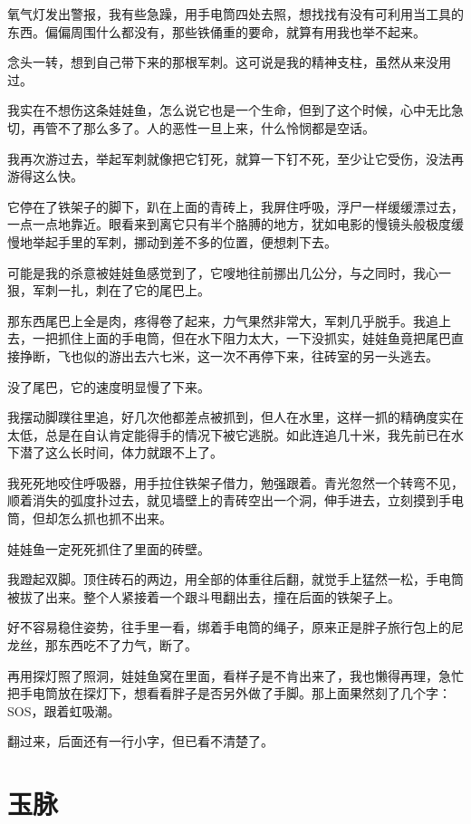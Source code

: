 氧气灯发出警报，我有些急躁，用手电筒四处去照，想找找有没有可利用当工具的东西。偏偏周围什么都没有，那些铁俑重的要命，就算有用我也举不起来。

念头一转，想到自己带下来的那根军刺。这可说是我的精神支柱，虽然从来没用过。

我实在不想伤这条娃娃鱼，怎么说它也是一个生命，但到了这个时候，心中无比急切，再管不了那么多了。人的恶性一旦上来，什么怜悯都是空话。

我再次游过去，举起军刺就像把它钉死，就算一下钉不死，至少让它受伤，没法再游得这么快。

它停在了铁架子的脚下，趴在上面的青砖上，我屏住呼吸，浮尸一样缓缓漂过去，一点一点地靠近。眼看来到离它只有半个胳膊的地方，犹如电影的慢镜头般极度缓慢地举起手里的军刺，挪动到差不多的位置，便想刺下去。

可能是我的杀意被娃娃鱼感觉到了，它嗖地往前挪出几公分，与之同时，我心一狠，军刺一扎，刺在了它的尾巴上。

那东西尾巴上全是肉，疼得卷了起来，力气果然非常大，军刺几乎脱手。我追上去，一把抓住上面的手电筒，但在水下阻力太大，一下没抓实，娃娃鱼竟把尾巴直接挣断，飞也似的游出去六七米，这一次不再停下来，往砖室的另一头逃去。

没了尾巴，它的速度明显慢了下来。

我摆动脚蹼往里追，好几次他都差点被抓到，但人在水里，这样一抓的精确度实在太低，总是在自认肯定能得手的情况下被它逃脱。如此连追几十米，我先前已在水下潜了这么长时间，体力就跟不上了。

我死死地咬住呼吸器，用手拉住铁架子借力，勉强跟着。青光忽然一个转弯不见，顺着消失的弧度扑过去，就见墙壁上的青砖空出一个洞，伸手进去，立刻摸到手电筒，但却怎么抓也抓不出来。

娃娃鱼一定死死抓住了里面的砖壁。

我蹬起双脚。顶住砖石的两边，用全部的体重往后翻，就觉手上猛然一松，手电筒被拔了出来。整个人紧接着一个跟斗甩翻出去，撞在后面的铁架子上。

好不容易稳住姿势，往手里一看，绑着手电筒的绳子，原来正是胖子旅行包上的尼龙丝，那东西吃不了力气，断了。

再用探灯照了照洞，娃娃鱼窝在里面，看样子是不肯出来了，我也懒得再理，急忙把手电筒放在探灯下，想看看胖子是否另外做了手脚。那上面果然刻了几个字：SOS，跟着虹吸潮。

翻过来，后面还有一行小字，但已看不清楚了。

\chapter{玉脉}

